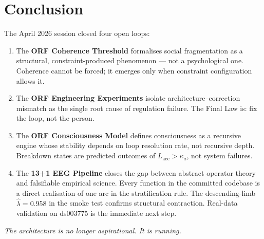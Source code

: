 \documentclass[12pt,a4paper]{article}
\theoremstyle{definition}
\newcommand{\lhat}{\hat{\lambda}}
\begin{document}
\section{Conclusion}

The April 2026 session closed four open loops:

\begin{enumerate}[leftmargin=*]
  \item The \textbf{ORF Coherence Threshold} formalises social fragmentation
        as a structural, constraint-produced phenomenon — not a psychological
        one.  Coherence cannot be forced; it emerges only when constraint
        configuration allows it.

  \item The \textbf{ORF Engineering Experiments} isolate architecture--correction
        mismatch as the single root cause of regulation failure.  The Final
        Law is: fix the loop, not the person.

  \item The \textbf{ORF Consciousness Model} defines consciousness as a
        recursive engine whose stability depends on loop resolution rate,
        not recursive depth.  Breakdown states are predicted outcomes of
        $L_\mathrm{acc} > \kappa_a$, not system failures.

  \item The \textbf{13+1 EEG Pipeline} closes the gap between abstract
        operator theory and falsifiable empirical science.  Every function
        in the committed codebase is a direct realisation of one arc in the
        stratification rule.  The descending-limb $\lhat = 0.958$ in the
        smoke test confirms structural contraction.  Real-data validation
        on ds003775 is the immediate next step.
\end{enumerate}

\vspace{1em}
\begin{center}
  \textit{The architecture is no longer aspirational.  It is running.}
\end{center}
\end{document}
